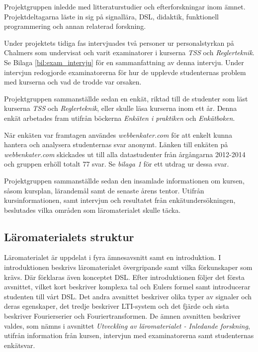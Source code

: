 \documentclass[]{article}
\begin{document}
Projektgruppen inledde med litteraturstudier och efterforskningar inom ämnet. Projektdeltagarna läste in sig på
signallära, DSL, didaktik, funktionell programmering och annan relaterad forskning.

Under projektets tidiga fas intervjuades två personer ur personalstyrkan på Chalmers
som undervisat och varit examinatorer i kurserna \textit{TSS} och
\textit{Reglerteknik}.
Se Bilaga \ref{bil:exam_intervju} för en sammanfattning
av denna intervju. Under intervjun redogjorde examinatorerna för hur de upplevde
studenternas problem med kurserna och vad de trodde var orsaken.

Projektgruppen sammanställde sedan en enkät, riktad till de studenter som läst kurserna \textit{TSS} och
\textit{Reglerteknik}, eller skulle läsa kurserna inom ett år. Denna enkät arbetades fram utifrån böckerna
\textit{Enkäten i praktiken} och \textit{Enkätboken}.

När enkäten var framtagen användes \textit{webbenkater.com} för att enkelt kunna hantera och analysera studenternas svar
anonymt.
Länken till enkäten på \textit{webbenkater.com} skickades ut till alla datastudenter från
årgångarna 2012-2014 och gruppen erhöll totalt 77 svar.  Se \textit{bilaga 1} för ett utdrag ur dessa svar.

Projektgruppen sammanställde sedan den insamlade informationen om kursen, såsom kursplan, lärandemål samt de senaste
årens tentor. Utifrån kursinformationen, samt intervjun och resultatet från enkätundersökningen, beslutades vilka
områden som läromaterialet skulle täcka.


\subsection{Läromaterialets struktur}

Läromaterialet är uppdelat i fyra ämnesavsnitt samt en introduktion. I introduktionen beskrivs läromaterialet
övergripande samt vilka förkunskaper som krävs. Där förklaras även konceptet DSL. Efter introduktionen följer det
första avsnittet, vilket kort beskriver komplexa tal och Eulers formel samt introducerar studenten till vårt DSL. Det
andra avsnittet beskriver olika typer av signaler och deras egenskaper, det tredje beskriver LTI-system och det fjärde
och sista beskriver Fourierserier och Fouriertransformen. De ämnen avsnitten beskriver valdes, som nämns i avsnittet
\textit{Utveckling av läromaterialet - Inledande forskning}, utifrån information från kursen, intervjun med
examinatorerna samt studenternas enkätsvar.
\end{document}
